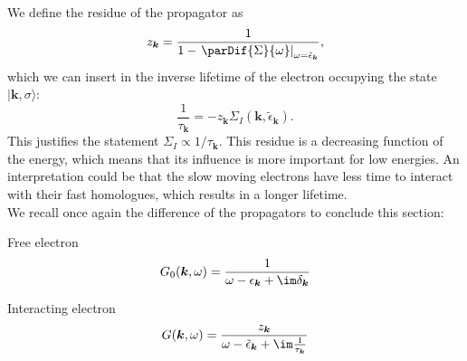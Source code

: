 \documentclass[../main.tex]{subfile}
\begin{document}
We define the residue of the propagator as 
\begin{equation}
    z_{\bm{k}} = \frac{1}{1- \left.\parDif{\Sigma}{\omega}\right|_{\omega = \tilde{\epsilon}_{\bm{k}}}}, \label{eq:residue}
\end{equation}
which we can insert in the inverse lifetime of the electron occupying the state $|\bm{k},\sigma\rangle$:
\begin{equation*}
    \frac{1}{\tau_{\bm{k}}} = - z_{\bm{k}} \Sigma_I(\bm{k}, \tilde{\epsilon}_{\bm{k}}).
\end{equation*}
This justifies the statement $ \Sigma_I \propto 1/\tau_{\bm{k}}$.
This residue is a decreasing function of the energy, which means that its influence is more important for low energies. 
An interpretation could be that the slow moving electrons have less time to interact with their fast homologues, which results in a
longer lifetime.\\

We recall once again the difference of the propagators to conclude this section:\vspace{6pt}\\
\begin{center}
\begin{minipage}{0.4\textwidth}
    \begin{center}
    Free electron
    \[G_0(\bm{k}, \omega) = \frac{1}{\omega- \epsilon_{\bm{k}}+\im \delta_{\bm{k}}}\]
\end{center}
\end{minipage}
\begin{minipage}{0.05\textwidth}
\end{minipage}
\begin{minipage}{0.4\textwidth}
    \begin{center}
        Interacting electron
    \[G(\bm{k}, \omega) = \frac{z_{\bm{k}}}{\omega- \tilde{\epsilon}_{\bm{k}}+\im \frac{1}{\tau_{\bm{k}}}}\]
    \end{center}
\end{minipage}
\end{center}
\end{document}
